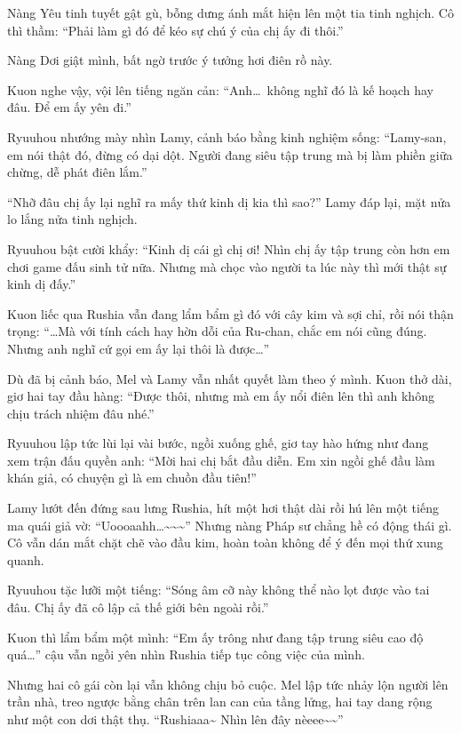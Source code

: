 \documentclass[../main.tex]{subfiles}
\begin{document}
Nàng Yêu tinh tuyết gật gù, bỗng dưng ánh mắt hiện lên một tia tinh nghịch. Cô thì thầm: ``Phải làm gì đó để kéo sự chú ý của chị ấy đi thôi.''

Nàng Dơi giật mình, bất ngờ trước ý tưởng hơi điên rồ này.

Kuon nghe vậy, vội lên tiếng ngăn cản: ``Anh\dots\ không nghĩ đó là kế hoạch hay đâu. Để em ấy yên đi.''

Ryuuhou nhướng mày nhìn Lamy, cảnh báo bằng kinh nghiệm sống: ``Lamy-san, em nói thật đó, đừng có dại dột. Người đang siêu tập trung mà bị làm phiền giữa chừng, dễ phát điên lắm.''

``Nhỡ đâu chị ấy lại nghĩ ra mấy thứ kinh dị kia thì sao?'' Lamy đáp lại, mặt nửa lo lắng nửa tinh nghịch.

Ryuuhou bật cười khẩy: ``Kinh dị cái gì chị ơi! Nhìn chị ấy tập trung còn hơn em chơi game đấu sinh tử nữa. Nhưng mà chọc vào người ta lúc này thì mới thật sự kinh dị đấy.''

Kuon liếc qua Rushia vẫn đang lẩm bẩm gì đó với cây kim và sợi chỉ, rồi nói thận trọng: ``\dots Mà với tính cách hay hờn dỗi của Ru-chan, chắc em nói cũng đúng. Nhưng anh nghĩ cứ gọi em ấy lại thôi là được\dots''

Dù đã bị cảnh báo, Mel và Lamy vẫn nhất quyết làm theo ý mình. Kuon thở dài, giơ hai tay đầu hàng: ``Được thôi, nhưng mà em ấy nổi điên lên thì anh không chịu trách nhiệm đâu nhé.''

Ryuuhou lập tức lùi lại vài bước, ngồi xuống ghế, giơ tay hào hứng như đang xem trận đấu quyền anh: ``Mời hai chị bắt đầu diễn. Em xin ngồi ghế đầu làm khán giả, có chuyện gì là em chuồn đầu tiên!''

\ct

Lamy lướt đến đứng sau lưng Rushia, hít một hơi thật dài rồi hú lên một tiếng ma quái giả vờ: ``Uoooaahh\dots\~{}\~{}\~{}'' Nhưng nàng Pháp sư chẳng hề có động thái gì. Cô vẫn dán mắt chặt chẽ vào đầu kim, hoàn toàn không để ý đến mọi thứ xung quanh.

Ryuuhou tặc lưỡi một tiếng: ``Sóng âm cỡ này không thể nào lọt được vào tai đâu. Chị ấy đã cô lập cả thế giới bên ngoài rồi.''

Kuon thì lẩm bẩm một mình: ``Em ấy trông như đang tập trung siêu cao độ quá\dots'' cậu vẫn ngồi yên nhìn Rushia tiếp tục công việc của mình.

Nhưng hai cô gái còn lại vẫn không chịu bỏ cuộc. Mel lập tức nhảy lộn người lên trần nhà, treo ngược bằng chân trên lan can của tầng lửng, hai tay dang rộng như một con dơi thật thụ. ``Rushiaaa\~{} Nhìn lên đây nèeee\~{}\~{}''
\end{document}
